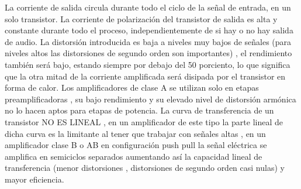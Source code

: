 \documentclass[12pt,a4paper]{article}
\begin{document}
La corriente de salida circula durante todo el ciclo de la señal de entrada, en un solo transistor. La corriente de polarización del transistor de salida es alta y constante durante todo el proceso, independientemente de si hay o no hay salida de audio. La distorsión introducida es baja a niveles muy bajos de señales (para niveles altos las distorsiones de segundo orden son importantes) , el rendimiento también será bajo, estando siempre por debajo del 50 porciento, lo que significa que la otra mitad de la corriente amplificada será disipada por el transistor en forma de calor. Los amplificadores de clase A se utilizan solo en etapas preamplificadoras , su bajo rendimiento y su elevado nivel de distorsión armónica no lo hacen aptos para etapas de potencia. La curva de transferencia de un transistor NO ES LINEAL , en un amplificador de este tipo la parte lineal de dicha curva es la limitante al tener que trabajar con señales altas , en un amplificador clase B o AB en configuración push pull la señal eléctrica se amplifica en semiciclos separados aumentando así la capacidad lineal de transferencia (menor distorsiones , distorsiones de segundo orden casi nulas) y mayor eficiencia.
\newpage
\end{document}
